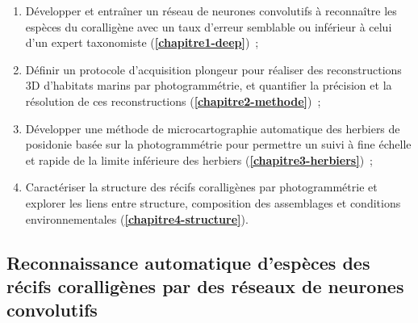 \begin{enumerate}
    \item Développer et entraîner un réseau de neurones convolutifs à reconnaître les espèces du coralligène avec un taux d’erreur semblable ou inférieur à celui d’un expert taxonomiste  (\textbf{\autoref{chapitre1-deep}})~;
    
    \item Définir un protocole d’acquisition plongeur pour réaliser des reconstructions 3D d’habitats marins par photogrammétrie, et quantifier la précision et la résolution de ces reconstructions  (\textbf{\autoref{chapitre2-methode}})~;
    
    \item Développer une méthode de microcartographie automatique des herbiers de posidonie basée sur la photogrammétrie pour permettre un suivi à fine échelle et rapide de la limite inférieure des herbiers  (\textbf{\autoref{chapitre3-herbiers}})~;
    
    \item Caractériser la structure des récifs coralligènes par photogrammétrie et explorer les liens entre structure, composition des assemblages et conditions environnementales (\textbf{\autoref{chapitre4-structure}}).
    
\end{enumerate}

\subsection{Reconnaissance automatique d’espèces des récifs coralligènes par des réseaux de neurones convolutifs}

